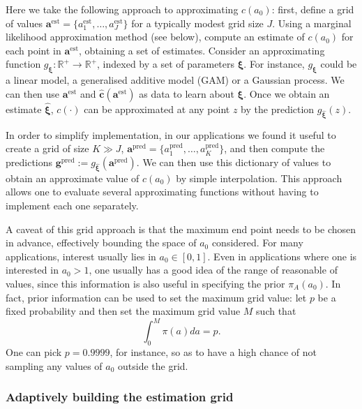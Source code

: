 \documentclass[a4paper, notitlepage, 11pt]{article}
\begin{document}
Here we take the following approach to approximating $c(a_0)$: first, define a grid of values $\boldsymbol a^{\text{est}} = \{ a^{\text{est}}_1, \ldots, a^{\text{est}}_J \}$ for a typically modest grid size $J$.
Using a marginal likelihood approximation method (see below), compute an estimate of $c(a_0)$ for each point in $\boldsymbol a^{\text{est}}$, obtaining a set of estimates.
Consider an approximating function $g_{\boldsymbol\xi} : \mathbb{R}^+ \to \mathbb{R}^+$, indexed by a set of parameters $\boldsymbol\xi$.
For instance, $g_{\boldsymbol\xi}$ could be a linear model, a generalised additive model (GAM) or a Gaussian process.
We can then use  $\boldsymbol a^{\text{est}}$ and $\hat{\boldsymbol c}(\boldsymbol a^{\text{est}})$ as data to learn about $\boldsymbol\xi$.
Once we obtain an estimate  $\hat{\boldsymbol \xi}$, $c(\cdot)$ can be approximated at any point $z$ by the prediction $g_{\hat{\boldsymbol \xi}}(z)$.

In order to simplify implementation, in our applications we found it useful to create a grid of size $K \gg J$, $\boldsymbol a^{\text{pred}} = \{ a^{\text{pred}}_1, \ldots, a^{\text{pred}}_K \}$, and then compute the predictions $\boldsymbol g^{\text{pred}} := g_{\hat{\boldsymbol \xi}}( \boldsymbol a^{\text{pred}} )$.
We can then use this dictionary of values to obtain an approximate value of $c(a_0)$ by simple interpolation.
This approach allows one to evaluate several approximating functions without having to implement each one separately.

A caveat of this grid approach is that the maximum end point needs to be chosen in advance, effectively bounding the space of $a_0$ considered. 
For many applications, interest usually lies in $a_0 \in [0, 1]$.
Even in applications where one is interested in $a_0 > 1$, one usually has a good idea of the range of reasonable of values, since this information is also useful in specifying the prior $\pi_A(a_0)$.
In fact, prior information can be used to set the maximum grid value: let $p$ be a fixed probability and then set the maximum grid value $M$ such that
\[ \int_0^M \pi(a) da = p. \]
One can pick $p = 0.9999$, for instance, so as to have a high chance of not sampling any values of $a_0$ outside the grid.

\subsubsection{Adaptively building the estimation grid}
\label{sec:adapt_grid}
\end{document}
